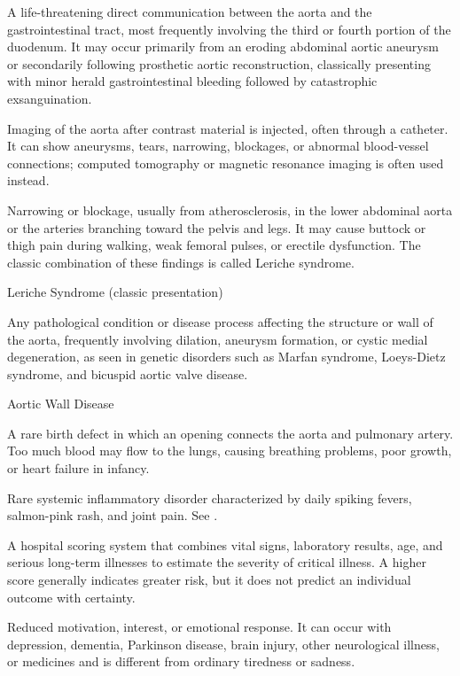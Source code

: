  A life-threatening direct communication between the aorta and the gastrointestinal tract, most frequently involving the third or fourth portion of the duodenum. It may occur primarily from an eroding abdominal aortic aneurysm or secondarily following prosthetic aortic reconstruction, classically presenting with minor herald gastrointestinal bleeding followed by catastrophic exsanguination.

 Imaging of the aorta after contrast material is injected, often through a catheter. It can show aneurysms, tears, narrowing, blockages, or abnormal blood-vessel connections; computed tomography or magnetic resonance imaging is often used instead.

 Narrowing or blockage, usually from atherosclerosis, in the lower abdominal aorta or the arteries branching toward the pelvis and legs. It may cause buttock or thigh pain during walking, weak femoral pulses, or erectile dysfunction. The classic combination of these findings is called Leriche syndrome.

\synonyms
Leriche Syndrome (classic presentation)

 Any pathological condition or disease process affecting the structure or wall of the aorta, frequently involving dilation, aneurysm formation, or cystic medial degeneration, as seen in genetic disorders such as Marfan syndrome, Loeys-Dietz syndrome, and bicuspid aortic valve disease.

\synonyms
Aortic Wall Disease

 A rare birth defect in which an opening connects the aorta and pulmonary artery. Too much blood may flow to the lungs, causing breathing problems, poor growth, or heart failure in infancy.

 Rare systemic inflammatory disorder characterized by daily spiking fevers, salmon-pink rash, and joint pain. See .

 A hospital scoring system that combines vital signs, laboratory results, age, and serious long-term illnesses to estimate the severity of critical illness. A higher score generally indicates greater risk, but it does not predict an individual outcome with certainty.

 Reduced motivation, interest, or emotional response. It can occur with depression, dementia, Parkinson disease, brain injury, other neurological illness, or medicines and is different from ordinary tiredness or sadness.


